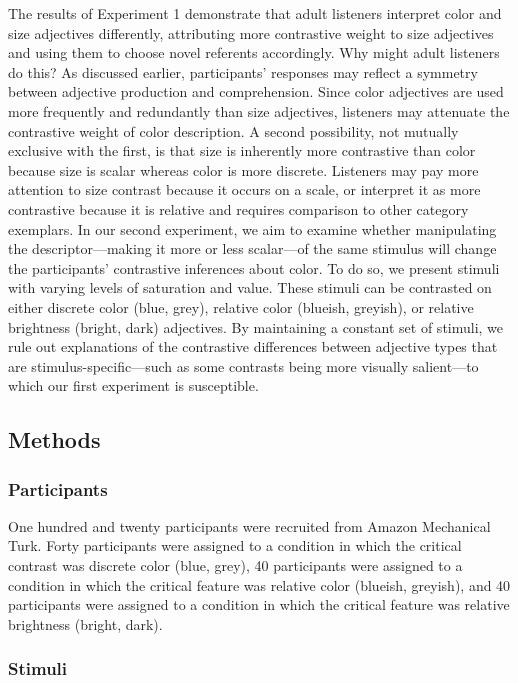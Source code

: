 \documentclass[10pt, letterpaper]{article}
\begin{document}
The results of Experiment 1 demonstrate that adult listeners interpret
color and size adjectives differently, attributing more contrastive
weight to size adjectives and using them to choose novel referents
accordingly. Why might adult listeners do this? As discussed earlier,
participants' responses may reflect a symmetry between adjective
production and comprehension. Since color adjectives are used more
frequently and redundantly than size adjectives, listeners may attenuate
the contrastive weight of color description. A second possibility, not
mutually exclusive with the first, is that size is inherently more
contrastive than color because size is scalar whereas color is more
discrete. Listeners may pay more attention to size contrast because it
occurs on a scale, or interpret it as more contrastive because it is
relative and requires comparison to other category exemplars. In our
second experiment, we aim to examine whether manipulating the
descriptor---making it more or less scalar---of the same stimulus will
change the participants' contrastive inferences about color. To do so,
we present stimuli with varying levels of saturation and value. These
stimuli can be contrasted on either discrete color (blue, grey),
relative color (blueish, greyish), or relative brightness (bright, dark)
adjectives. By maintaining a constant set of stimuli, we rule out
explanations of the contrastive differences between adjective types that
are stimulus-specific---such as some contrasts being more visually
salient---to which our first experiment is susceptible.

\subsection{Methods}\label{methods-1}

\subsubsection{Participants}\label{participants-1}

One hundred and twenty participants were recruited from Amazon
Mechanical Turk. Forty participants were assigned to a condition in
which the critical contrast was discrete color (blue, grey), 40
participants were assigned to a condition in which the critical feature
was relative color (blueish, greyish), and 40 participants were assigned
to a condition in which the critical feature was relative brightness
(bright, dark).

\subsubsection{Stimuli}\label{stimuli-1}
\end{document}
